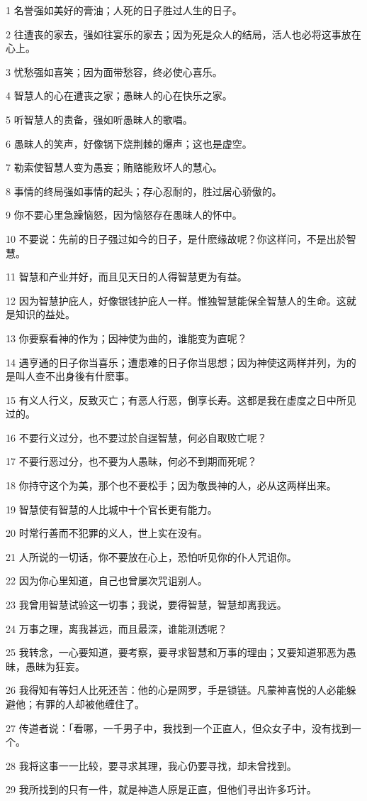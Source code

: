 \par 1 名誉强如美好的膏油；人死的日子胜过人生的日子。
\par 2 往遭丧的家去，强如往宴乐的家去；因为死是众人的结局，活人也必将这事放在心上。
\par 3 忧愁强如喜笑；因为面带愁容，终必使心喜乐。
\par 4 智慧人的心在遭丧之家；愚昧人的心在快乐之家。
\par 5 听智慧人的责备，强如听愚昧人的歌唱。
\par 6 愚昧人的笑声，好像锅下烧荆棘的爆声；这也是虚空。
\par 7 勒索使智慧人变为愚妄；贿赂能败坏人的慧心。
\par 8 事情的终局强如事情的起头；存心忍耐的，胜过居心骄傲的。
\par 9 你不要心里急躁恼怒，因为恼怒存在愚昧人的怀中。
\par 10 不要说：先前的日子强过如今的日子，是什麽缘故呢？你这样问，不是出於智慧。
\par 11 智慧和产业并好，而且见天日的人得智慧更为有益。
\par 12 因为智慧护庇人，好像银钱护庇人一样。惟独智慧能保全智慧人的生命。这就是知识的益处。
\par 13 你要察看神的作为；因神使为曲的，谁能变为直呢？
\par 14 遇亨通的日子你当喜乐；遭患难的日子你当思想；因为神使这两样并列，为的是叫人查不出身後有什麽事。
\par 15 有义人行义，反致灭亡；有恶人行恶，倒享长寿。这都是我在虚度之日中所见过的。
\par 16 不要行义过分，也不要过於自逞智慧，何必自取败亡呢？
\par 17 不要行恶过分，也不要为人愚昧，何必不到期而死呢？
\par 18 你持守这个为美，那个也不要松手；因为敬畏神的人，必从这两样出来。
\par 19 智慧使有智慧的人比城中十个官长更有能力。
\par 20 时常行善而不犯罪的义人，世上实在没有。
\par 21 人所说的一切话，你不要放在心上，恐怕听见你的仆人咒诅你。
\par 22 因为你心里知道，自己也曾屡次咒诅别人。
\par 23 我曾用智慧试验这一切事；我说，要得智慧，智慧却离我远。
\par 24 万事之理，离我甚远，而且最深，谁能测透呢？
\par 25 我转念，一心要知道，要考察，要寻求智慧和万事的理由；又要知道邪恶为愚昧，愚昧为狂妄。
\par 26 我得知有等妇人比死还苦：他的心是网罗，手是锁链。凡蒙神喜悦的人必能躲避他；有罪的人却被他缠住了。
\par 27 传道者说：「看哪，一千男子中，我找到一个正直人，但众女子中，没有找到一个。
\par 28 我将这事一一比较，要寻求其理，我心仍要寻找，却未曾找到。
\par 29 我所找到的只有一件，就是神造人原是正直，但他们寻出许多巧计。

